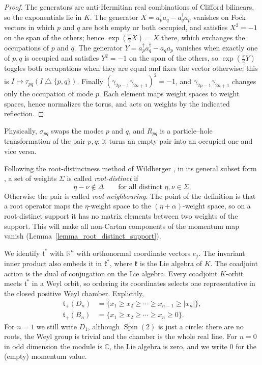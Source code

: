 \documentclass{article}
\theoremstyle{definition}
\theoremstyle{remark}
\newcommand{\C}{\mathbb C}
\newcommand{\R}{\mathbb R}
\newcommand{\Spin}{\operatorname{Spin}}
\newcommand{\symdiff}{\mathbin{\triangle}}
\begin{document}
\begin{proof}
The generators are anti-Hermitian real combinations of Clifford bilinears,
so the exponentials lie in $K$. The generator
$X=a_p^\dagger a_q-a_q^\dagger a_p$ vanishes on Fock vectors in which $p$ and
$q$ are both empty or both occupied, and satisfies $X^2=-1$ on the span of
the others; hence $\exp(\frac\pi2X)=X$ there, which exchanges the
occupations of $p$ and $q$. The generator
$Y=a_p^\dagger a_q^\dagger-a_qa_p$ vanishes when exactly one of $p,q$ is
occupied and satisfies $Y^2=-1$ on the span of the others, so
$\exp(\frac\pi2Y)$ toggles both occupations when they are equal and fixes
the vector otherwise; this is $I\mapsto\tau_{pq}(I\symdiff\{p,q\})$. Finally
$(\gamma_{2p-1}\gamma_{2n+1})^2=-1$, and $\gamma_{2p-1}\gamma_{2n+1}$ changes
only the occupation of mode $p$. Each element maps weight spaces to weight
spaces, hence normalizes the torus, and acts on weights by the indicated
reflection.
\end{proof}

Physically, $\sigma_{pq}$ swaps the modes $p$ and $q$, and $R_{pq}$ is a
particle--hole transformation of the pair $p,q$: it turns an empty pair into
an occupied one and vice versa.

Following the root-distinctness method of Wildberger
\cite{Wildberger1992TheMM}, in its general subset form
\cite{Tsanov2019}, a set of weights
$\Sigma$ is called \emph{root-distinct} if
\begin{equation}
 \eta-\nu\notin\Delta
 \qquad\text{for all distinct }\eta,\nu\in\Sigma.
 \label{eq:root-distinct}
\end{equation}
Otherwise the pair is called \emph{root-neighbouring}. The point of the
definition is that a root operator maps the $\eta$-weight space to the
$(\eta+\alpha)$-weight space, so on a root-distinct support it has no matrix
elements between two weights of the support. This will make all non-Cartan
components of the momentum map vanish
(Lemma~\ref{lemma_root_distinct_support}).

We identify $\mathfrak t^*$ with $\R^n$ with orthonormal coordinate vectors
$e_j$. The invariant inner product also embeds it in $\mathfrak k^*$,
where $\mathfrak k$ is the Lie algebra of $K$. The coadjoint action is the dual of conjugation on the
Lie algebra. Every coadjoint $K$-orbit meets $\mathfrak t^*$ in a Weyl
orbit, so ordering its coordinates selects one representative in the
closed positive Weyl chamber. Explicitly,
\begin{align}
 \mathfrak t_+(D_n)
 &=\{x_1\ge x_2\ge\cdots\ge x_{n-1}\ge|x_n|\},\label{eq:Dn-chamber}\\
 \mathfrak t_+(B_n)
 &=\{x_1\ge x_2\ge\cdots\ge x_n\ge0\}.
 \label{eq:Bn-chamber}
\end{align}
For $n=1$ we still write $D_1$, although $\Spin(2)$ is just a circle: there
are no roots, the Weyl group is trivial and the chamber is the whole real
line. For $n=0$ in odd dimension the module is $\C$, the Lie algebra is zero,
and we write $0$ for the (empty) momentum value.
\end{document}
